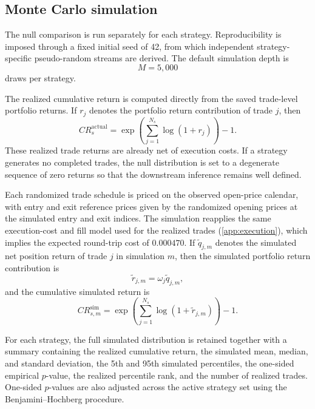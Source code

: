 \documentclass[preprint,12pt]{elsarticle}
\theoremstyle{definition}
\begin{document}
\subsection{Monte Carlo simulation}

The null comparison is run separately for each strategy. Reproducibility is imposed through a fixed initial seed of 42, from which independent strategy-specific pseudo-random streams are derived. The default simulation depth is
\begin{equation}
M=5{,}000
\end{equation}
draws per strategy.

The realized cumulative return is computed directly from the saved trade-level portfolio returns. If \(r_j\) denotes the portfolio return contribution of trade \(j\), then
\begin{equation}
CR_s^{\mathrm{actual}}
=
\exp\left(\sum_{j=1}^{N_s}\log(1+r_j)\right)-1.
\end{equation}
These realized trade returns are already net of execution costs. If a strategy generates no completed trades, the null distribution is set to a degenerate sequence of zero returns so that the downstream inference remains well defined.

Each randomized trade schedule is priced on the observed open-price calendar, with entry and exit reference prices given by the randomized opening prices at the simulated entry and exit indices. The simulation reapplies the same execution-cost and fill model used for the realized trades (\ref{app:execution}), which implies the expected round-trip cost of $0.000470$. If \(\tilde{q}_{j,m}\) denotes the simulated net position return of trade \(j\) in simulation \(m\), then the simulated portfolio return contribution is
\begin{equation}
\tilde{r}_{j,m}=\omega_j \tilde{q}_{j,m},
\end{equation}
and the cumulative simulated return is
\begin{equation}
CR_{s,m}^{\mathrm{sim}}
=
\exp\left(\sum_{j=1}^{N_s}\log(1+\tilde{r}_{j,m})\right)-1.
\end{equation}

For each strategy, the full simulated distribution is retained together with a summary containing the realized cumulative return, the simulated mean, median, and standard deviation, the 5th and 95th simulated percentiles, the one-sided empirical \(p\)-value, the realized percentile rank, and the number of realized trades. One-sided \(p\)-values are also adjusted across the active strategy set using the Benjamini--Hochberg procedure.
\end{document}

